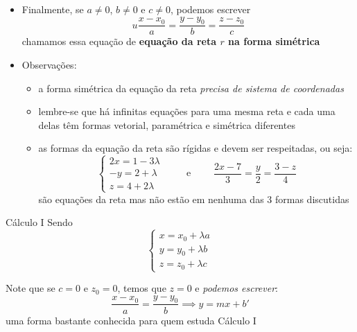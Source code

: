 \begin{frame}
    \begin{itemize}
        \item Finalmente, se \(a \neq 0\), \(b \neq 0 \) e \(c \neq 0\), podemos escrever
            \[u
                \frac{x-x_0}{a} = \frac{y-y_0}{b} = \frac{z-z_0}{c}
            \]
            chamamos essa equação de \textbf{equação da reta \(r\) na forma simétrica}
        \item Observações:
            \begin{itemize}
                \item a forma simétrica da equação da reta \textit{precisa de sistema de coordenadas}
                \item lembre-se que há infinitas equações para uma mesma reta e
                    cada uma delas têm formas vetorial, paramétrica e simétrica diferentes
                \item as formas da equação da reta são rígidas e devem ser respeitadas, ou seja:
                    \[
                        \begin{cases}
                            2x=1-3\lambda \\ -y = 2+\lambda \\ z=4+2\lambda
                        \end{cases}
                        \qquad \text{ e } \qquad
                        \frac{2x-7}{3} = \frac{y}{2} = \frac{3-z}{4}
                    \]
                    são equações da reta mas não estão em nenhuma das 3 formas discutidas
            \end{itemize}
    \end{itemize}

\end{frame}

\begin{frame}{Cálculo I}
    Sendo
    \[
        \begin{cases}
            x = x_0 + \lambda a \\
            y = y_0 + \lambda b \\
            z = z_0 + \lambda c
        \end{cases}
    \]

    Note que se \(c=0\) e \(z_0 = 0\), temos que \(z=0\) e \textit{podemos escrever}:
    \[
        \frac{x-x_0}{a} = \frac{y-y_0}{b} \implies y = mx + b'
    \]
    uma forma bastante conhecida para quem estuda Cálculo I
\end{frame}


